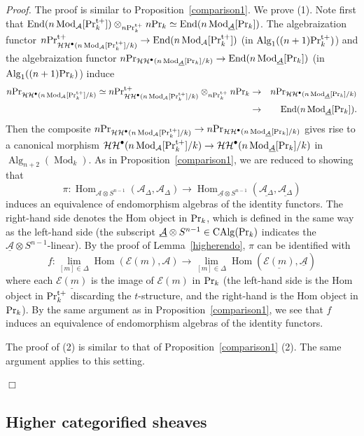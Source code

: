 \documentclass[leqno,12pt]{amsart}
\theoremstyle{plain}
\theoremstyle{definition}
\newcommand{\HH}{\operatorname{\mathcal{HH}}}
\newcommand{\AAA}{\mathcal{A}}
\newcommand{\PR}{\textup{Pr}}
\newcommand{\PRTT}{\textup{Pr}^{\textup{t}+}}
\newcommand{\Hom}{\operatorname{Hom}}
\newcommand{\Mod}{\operatorname{Mod}}
\newcommand{\Alg}{\operatorname{Alg}}
\newcommand{\End}{\operatorname{End}}
\newcommand{\CAlg}{\operatorname{CAlg}}
\newcommand{\Proof}{{\sl Proof.}\quad}
\newcommand{\QED}{{\unskip\nobreak\hfil\penalty50\quad\null\nobreak\hfil
{$\Box$}\parfillskip0pt\finalhyphendemerits0\par\medskip}}
\begin{document}
\Proof
The proof is similar to Proposition~\ref{comparison1}.
We prove (1).
Note first that $\End(n\Mod_{\AAA}[\PRTT_k])\otimes_{n\PRTT_k}n\PR_k\simeq \End(n\Mod_{\underline{\AAA}}[\PR_k])$.
The algebraization functor $n\PRTT_{\HH^\bullet(n\Mod_{\AAA}[\PRTT_k]/k)}\to \End(n\Mod_{\AAA}[\PRTT_k])$ (in $\Alg_1((n+1)\PRTT_k)$)
and the algebraization functor $n\PR_{\HH^\bullet(n\Mod_{\underline{\AAA}}[\PR_k]/k)}\to \End(n\Mod_{\underline{\AAA}}[\PR_k])$ (in $\Alg_1((n+1)\PR_k)$)
induce  
\begin{eqnarray*}
n\PR_{\HH^\bullet(n\Mod_{\AAA}[\PRTT_k]/k)}\simeq  n\PRTT_{\HH^\bullet(n\Mod_{\AAA}[\PRTT_k]/k)}\otimes_{n\PRTT_k}n\PR_k &\to&  n\PR_{\HH^\bullet(n\Mod_{\underline{\AAA}}[\PR_k]/k)}  \\
&\to& \End(n\Mod_{\underline{\AAA}}[\PR_k]).
\end{eqnarray*}
Then the composite  $n\PR_{\HH^\bullet(n\Mod_{\AAA}[\PRTT_k]/k)}\to n\PR_{\HH^\bullet(n\Mod_{\underline{\AAA}}[\PR_k]/k)}$
gives rise to a canonical morphism $\HH^\bullet(n\Mod_{\AAA}[\PRTT_k]/k)\to \HH^\bullet(n\Mod_{\underline{\AAA}}[\PR_k]/k)$ in $\Alg_{n+2}(\Mod_k)$.
As in Proposition~\ref{comparison1}, we are reduced to showing that
\[
\pi:\Hom_{\AAA\otimes S^{n-1}}(\AAA_{\Delta},\AAA_{\Delta}) \to \Hom_{\underline{\AAA}\otimes S^{n-1}}(\underline{\AAA_{\Delta}},\underline{\AAA_{\Delta}})  
\]
induces an equivalence of endomorphism algebras of the identity functors.
The right-hand side denotes the 
Hom object in $\PR_k$, which is defined in the same way as the left-hand side (the subscript $\underline{\AAA}\otimes S^{n-1}\in \CAlg(\PR_k)$ indicates the $\underline{\AAA}\otimes S^{n-1}$-linear).
By the proof of Lemma~\ref{higherendo}, $\pi$ can be identified with
\[
f:\lim_{[m]\in \Delta}\Hom(\mathcal{E}(m),\AAA)\to \lim_{[m]\in \Delta}\Hom(\underline{\mathcal{E}(m)},\underline{\AAA})
\]
where each $\underline{\mathcal{E}(m)}$ is the image of $\mathcal{E}(m)$ in $\PR_k$ (the left-hand side is the Hom object in $\PRTT_k$ discarding the $t$-structure,
and the right-hand is the Hom object in $\PR_k$). 
By the same argument as in Proposition~\ref{comparison1}, we see that $f$ 
induces an equivalence of endomorphism algebras of the identity functors.

The proof of (2) is similar to that of Proposition~\ref{comparison1} (2).
The same argument applies to this setting.
\QED








\subsection{Higher categorified sheaves}
\end{document}

